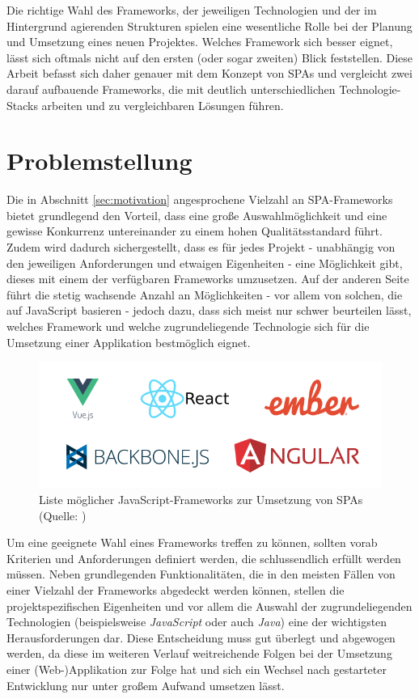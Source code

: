 \documentclass[a4paper,12pt,twoside]{scrreprt}
\begin{document}
\newpage

Die richtige Wahl des Frameworks, der jeweiligen Technologien und der im Hintergrund agierenden Strukturen spielen eine wesentliche Rolle bei der Planung und Umsetzung eines neuen Projektes. Welches Framework sich besser eignet, lässt sich oftmals nicht auf den ersten (oder sogar zweiten) Blick feststellen. Diese Arbeit befasst sich daher genauer mit dem Konzept von \acp{SPA} und vergleicht zwei darauf aufbauende Frameworks, die mit deutlich unterschiedlichen Technologie-Stacks arbeiten und zu vergleichbaren Lösungen führen.

\section{Problemstellung}
\label{sec:problemstellung}
Die in Abschnitt \ref{sec:motivation} angesprochene Vielzahl an \ac{SPA}-Frameworks bietet grundlegend den Vorteil, dass eine große Auswahlmöglichkeit und eine gewisse Konkurrenz untereinander zu einem hohen Qualitätsstandard führt. Zudem wird dadurch sichergestellt, dass es für jedes Projekt - unabhängig von den jeweiligen Anforderungen und etwaigen Eigenheiten - eine Möglichkeit gibt, dieses mit einem der verfügbaren Frameworks umzusetzen. Auf der anderen Seite führt die stetig wachsende Anzahl an Möglichkeiten - vor allem von solchen, die auf JavaScript basieren - jedoch dazu, dass sich meist nur schwer beurteilen lässt, welches Framework und welche zugrundeliegende Technologie sich für die Umsetzung einer Applikation bestmöglich eignet.

\begin{figure}[ht]
    \centering
    \includegraphics[scale=0.5]{images/A_JS-frameworks.png}
    \caption[Liste möglicher JavaScript-Frameworks zur Umsetzung von \acsp{SPA}]{Liste möglicher JavaScript-Frameworks zur Umsetzung von \acsp{SPA} (Quelle: \cite[][]{a_best_2020})}
    \label{fig:js-frameworks}
\end{figure}

Um eine geeignete Wahl eines Frameworks treffen zu können, sollten vorab Kriterien und Anforderungen definiert werden, die schlussendlich erfüllt werden müssen. Neben grundlegenden Funktionalitäten, die in den meisten Fällen von einer Vielzahl der Frameworks abgedeckt werden können, stellen die projektspezifischen Eigenheiten und vor allem die Auswahl der zugrundeliegenden Technologien (beispielsweise \textit{JavaScript} oder auch \textit{Java}) eine der wichtigsten Herausforderungen dar. Diese Entscheidung muss gut überlegt und abgewogen werden, da diese im weiteren Verlauf weitreichende Folgen bei der Umsetzung einer (Web-)Applikation zur Folge hat und sich ein Wechsel nach gestarteter Entwicklung nur unter großem Aufwand umsetzen lässt.
\end{document}
